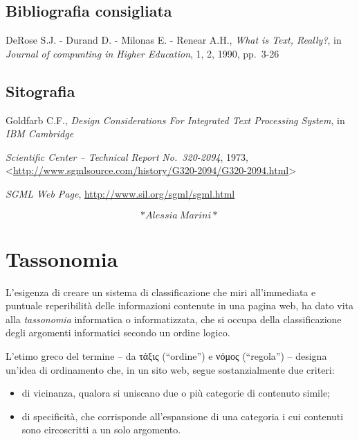 \documentclass[
  b5paper,
  twoside,
  12pt,
  chapterprefix=false,
  bibliography=totocnumbered,
  parskip=false]{scrbook}
\begin{document}
\hypertarget{bibliografia-consigliata-23}{%
\section*{Bibliografia consigliata}\label{bibliografia-consigliata-23}}

DeRose S.J. - Durand D. - Milonas E. - Renear A.H., \emph{What is Text,
Really?}, in \emph{Journal of compunting in Higher Education}, 1, 2, 1990,
pp.~3-26

\hypertarget{sitografia-29}{%
\section*{Sitografia}\label{sitografia-29}}

Goldfarb C.F., \emph{Design Considerations For Integrated Text Processing
System}, in \emph{IBM Cambridge}

\emph{Scientific Center -- Technical Report} \emph{No.~320-2094}, 1973,
\textless{}\href{http://www.sgmlsource.com/history/G320-2094/G320-2094.html}{{http://www.sgmlsource.com/history/G320-2094/G320-2094.html}}\textgreater{}

\emph{SGML Web Page}, \url{http://www.sil.org/sgml/sgml.html}

\[*Alessia~Marini*\]

\hypertarget{tassonomia}{%
\chapter{Tassonomia}\label{tassonomia}}

L'esigenza di creare un sistema di classificazione che miri
all'immediata e puntuale reperibilità delle informazioni contenute in
una pagina web, ha dato vita alla \emph{tassonomia} informatica o
informatizzata, che si occupa della classificazione degli argomenti
informatici secondo un ordine logico.

L'etimo greco del termine -- da τάξις (\enquote{ordine}) e νόμος (\enquote{regola}) --
designa un'idea di ordinamento che, in un sito web, segue
sostanzialmente due criteri:

\begin{itemize}
\item
  di vicinanza, qualora si uniscano due o più categorie di contenuto
  simile;
\item
  di specificità, che corrisponde all'espansione di una categoria i
  cui contenuti sono circoscritti a un solo argomento.
\end{itemize}
\end{document}
